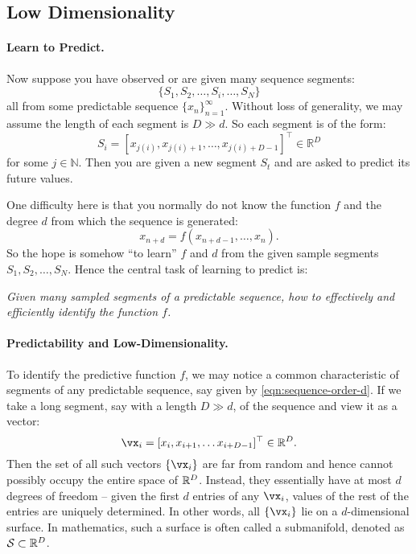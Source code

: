 \documentclass[\toplevelprefix/book-main.tex]{subfiles}
\begin{document}
\subsection{Low Dimensionality}\label{sec:intro-low-dimensionality}
\paragraph{Learn to Predict.}
Now suppose you have observed or are given many sequence segments:
\begin{equation}
    \{S_1, S_2, \ldots, S_i, \ldots, S_N\}
\end{equation}
all from some predictable sequence $\{x_n\}_{n=1}^\infty$. Without loss of generality, we may assume the length of each segment is $D \gg d$. So each segment is of the form:
\begin{equation}
    S_i = [x_{j(i)}, x_{j(i)+1}, \ldots, x_{j(i)+D-1}]^\top \in \mathbb{R}^D
\end{equation}
for some $j \in \mathbb{N}$. Then you are given a new segment $S_t$ and are asked to predict its future values. 

One difficulty here is that you normally do not know the function $f$ and the degree $d$ from which the sequence is generated: 
\begin{equation}
    x_{n+d} = f(x_{n+d-1}, \ldots,  x_{n}).
\label{eqn:sequence-order-d}
\end{equation}
So the hope is somehow ``to learn'' $f$ and $d$ from the given sample segments $S_1, S_2, \ldots, S_N$. Hence the central task of learning to predict is:
\begin{center}
{\em Given many sampled segments of a predictable sequence, how to effectively and efficiently identify the function $f$.}
\end{center}

\paragraph{Predictability and Low-Dimensionality.}
To identify the predictive function $f$, we may notice a common characteristic of segments of any predictable sequence, say given by \eqref{eqn:sequence-order-d}. If we take a long segment, say with a length $D \gg d$, of the sequence and view it as a vector: 
\begin{equation}
    \vx_i = [x_i, x_{i+1}, \ldots x_{i+D-1}]^\top \in \mathbb{R}^D.
\end{equation}
Then the set of all such vectors $\{\vx_i\}$ are far from random and hence cannot possibly occupy the entire space of $\mathbb{R}^D$. Instead, they essentially have at most $d$ degrees of freedom -- given the first $d$ entries of any $\vx_i$, values of the rest of the entries are uniquely determined. In other words, all $\{\vx_i\}$ lie on a $d$-dimensional surface. In mathematics, such a surface is often called a submanifold, denoted as $\mathcal{S} \subset \mathbb{R}^D$.
\end{document}
